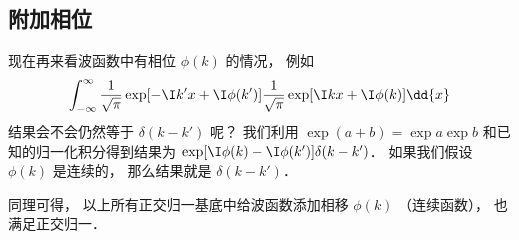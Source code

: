 \subsection{附加相位}
现在再来看波函数中有相位 $\phi(k)$ 的情况， 例如
\begin{equation}
\int_{-\infty}^{\infty} \frac{1}{\sqrt{\pi}}\exp[-\I k' x + \I \phi(k')] \frac{1}{\sqrt{\pi}}\exp[\I k x + \I \phi(k)] \dd{x}
\end{equation}
结果会不会仍然等于 $\delta(k - k')$ 呢？ 我们利用 $\exp(a + b) = \exp a\exp b$ 和已知的归一化积分得到结果为 $\exp[\I\phi(k) - \I\phi(k')] \delta(k - k')$． 如果我们假设 $\phi(k)$ 是连续的， 那么结果就是 $\delta(k - k')$．

同理可得， 以上所有正交归一基底中给波函数添加相移 $\phi(k)$ （连续函数）， 也满足正交归一．
